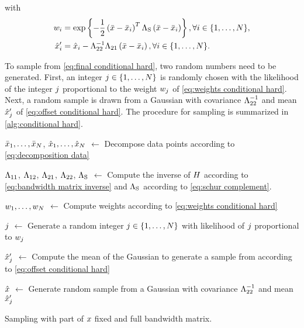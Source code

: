 with
\begin{align}
	\label{eq:weights conditional hard}
	w_{i} &= \exp\left\{ 
		-\frac{1}{2} \left(\bar{x} - \bar{x}_{i}\right)^T 
		\Lambda_{\mathrm{S}}
		\left(\bar{x} - \bar{x}_{i}\right) \right\},
	\forall i \in \{1,\ldots,N\}, \\
	\label{eq:offset conditional hard}
	\hat{x}_{i}' &= \hat{x}_{i} - \Lambda_{22}^{-1}\Lambda_{21} \left(\bar{x} - \bar{x}_{i} \right),
	\forall i \in \{1,\ldots,N\}.
\end{align}

To sample from \cref{eq:final conditional hard}, two random numbers need to be generated. 
First, an integer $j\in\{1,\ldots,N\}$ is randomly chosen with the likelihood of the integer $j$ proportional to the weight $w_{j}$ of \cref{eq:weights conditional hard}. 
Next, a random sample is drawn from a Gaussian with covariance $\Lambda_{22}^{-1}$ and mean $\hat{x}_{j}'$ of \cref{eq:offset conditional hard}.
The procedure for sampling is summarized in \cref{alg:conditional hard}.


\begin{algorithm}[t]
	
	$\bar{x}_{1},\ldots,\bar{x}_{N}$, $\hat{x}_{1},\ldots,\hat{x}_{N}$ $\gets$ Decompose data points according to \cref{eq:decomposition data}
	
	$\Lambda_{11}$, $\Lambda_{12}$, $\Lambda_{21}$, $\Lambda_{22}$, $\Lambda_{\mathrm{S}}$ $\gets$ Compute the inverse of $H$ according to \cref{eq:bandwidth matrix inverse} and $\Lambda_{\mathrm{S}}$ according to \cref{eq:schur complement}.
	
	$w_{1},\ldots,w_{N}$ $\gets$ Compute weights according to \cref{eq:weights conditional hard}
	
	$j$ $\gets$ Generate a random integer $j\in\{1,\ldots,N\}$ with likelihood of $j$ proportional to $w_{j}$
	
	$\hat{x}_{j}'$ $\gets$ Compute the mean of the Gaussian to generate a sample from according to \cref{eq:offset conditional hard}
	
	$\hat{x}$ $\gets$ Generate random sample from a Gaussian with covariance $\Lambda_{22}^{-1}$ and mean $\hat{x}_{j}'$
		
	\caption{Sampling with part of $x$ fixed and full bandwidth matrix.}
	\label{alg:conditional hard}
\end{algorithm}



